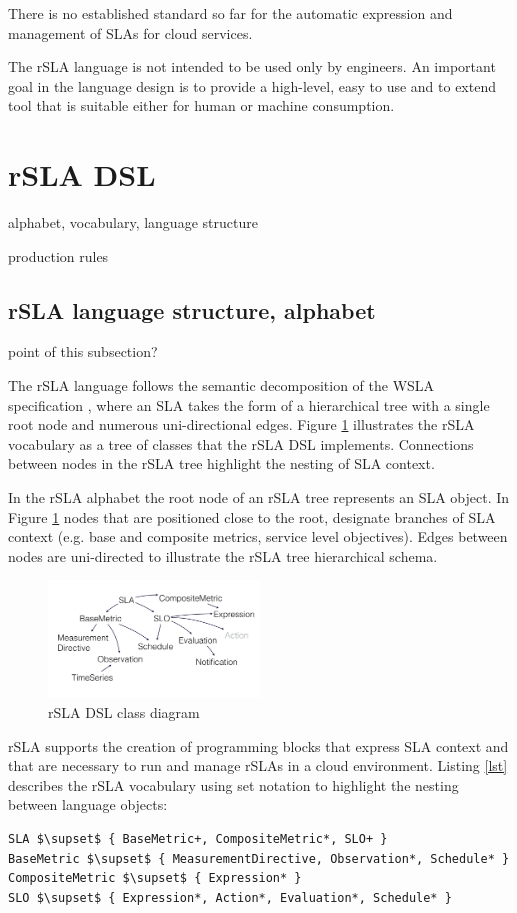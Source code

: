 \documentclass{llncs}
\begin{document}
There is no established standard so far for the automatic expression and management of SLAs for cloud services.

The rSLA language is not intended to be used only by engineers. An important goal in the language design is to provide a high-level, easy to use and to extend tool that is suitable either for human or machine consumption.

\section{rSLA DSL}

alphabet, vocabulary, language structure

production rules


\subsection{rSLA language structure, alphabet}

 point of this subsection?

The rSLA language follows the semantic decomposition of the WSLA specification \cite{wsla}, where an SLA takes the form of a hierarchical tree with a single root node and numerous uni-directional edges. Figure \ref{rSLA_diag} illustrates the rSLA vocabulary as a tree of classes that the rSLA DSL implements. Connections between nodes in the rSLA tree highlight the nesting of SLA context. 

In the rSLA alphabet the root node of an rSLA tree represents an SLA object. In Figure \ref{rSLA_diag} nodes that are positioned close to the root, designate branches of SLA context (e.g. base and composite metrics, service level objectives). Edges between nodes are uni-directed to illustrate the rSLA tree hierarchical schema.

\begin{figure}
  \centering
    \includegraphics[width=0.5\textwidth]{pics/rslauser}
    \caption{rSLA DSL class diagram}
    \label{rSLA_diag}
\end{figure}

 rSLA supports the creation of programming blocks that express SLA context and that are necessary to run and manage rSLAs in a cloud environment. Listing \ref{lst} describes the rSLA vocabulary using set notation to highlight the nesting between language objects:
\begin{lstlisting}[breaklines, mathescape, firstnumber=auto, caption=rSLA vocabulary, label=lst]
SLA $\supset$ { BaseMetric+, CompositeMetric*, SLO+ }
BaseMetric $\supset$ { MeasurementDirective, Observation*, Schedule* }
CompositeMetric $\supset$ { Expression* }
SLO $\supset$ { Expression*, Action*, Evaluation*, Schedule* }
\end{lstlisting}
\end{document}
